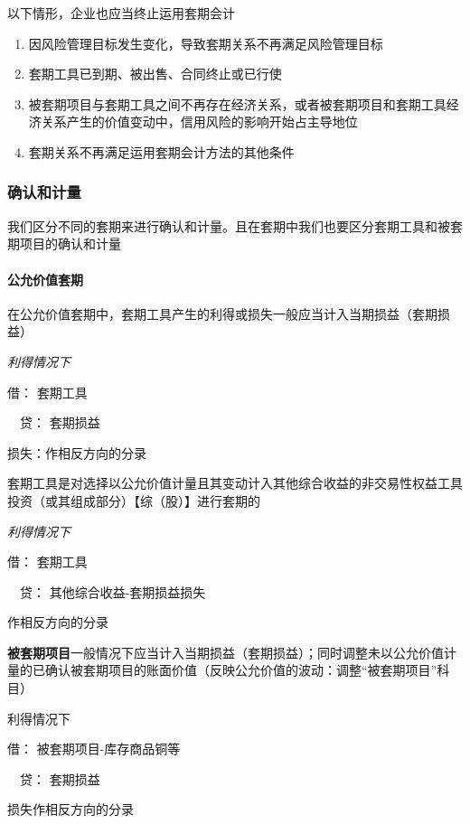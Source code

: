\documentclass[UTF8,12pt]{ctexart}
\newenvironment{Dr}{\noindent 借：}{\par}
\newenvironment{Cr}{\noindent \ \ 贷：}{\par}
\numberwithin{equation}{section} %
\numberwithin{figure}{section}
\numberwithin{table}{section}
\begin{document}
	以下情形，企业也应当终止运用套期会计
	\begin{enumerate}
		\item 因风险管理目标发生变化，导致套期关系不再满足风险管理目标
		
		\item 套期工具已到期、被出售、合同终止或已行使
		
		\item 被套期项目与套期工具之间不再存在经济关系，或者被套期项目和套期工具经济关系产生的价值变动中，信用风险的影响开始占主导地位
		
		\item 套期关系不再满足运用套期会计方法的其他条件
	\end{enumerate}
	
	\subsubsection{确认和计量}
	我们区分不同的套期来进行确认和计量。且在套期中我们也要区分套期工具和被套期项目的确认和计量
	
	\paragraph{公允价值套期}
	
	在公允价值套期中，套期工具产生的利得或损失一般应当计入当期损益（套期损益）

	\textit{利得情况下}
	
	\begin{Dr}
		套期工具
	\end{Dr}
	\begin{Cr}
		套期损益
	\end{Cr}
	损失：作相反方向的分录
	
	套期工具是对选择以公允价值计量且其变动计入其他综合收益的非交易性权益工具投资（或其组成部分）【综（股）】进行套期的
	
	\textit{利得情况下}
	
	\begin{Dr}
		套期工具
	\end{Dr}
	\begin{Cr}
		其他综合收益-套期损益损失
	\end{Cr}
	作相反方向的分录
	
	\textbf{被套期项目}一般情况下应当计入当期损益（套期损益）；同时调整未以公允价值计量的已确认被套期项目的账面价值（反映公允价值的波动：调整“被套期项目”科目）
	
	利得情况下
	
	\begin{Dr}
		被套期项目-库存商品铜等
	\end{Dr}
	\begin{Cr}
		套期损益
	\end{Cr}
	损失作相反方向的分录
	
\end{document}
